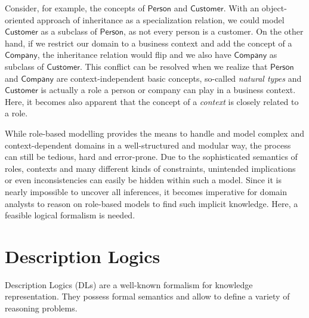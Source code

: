 Consider, for example, the concepts of $\mathsf{Person}$ and $\mathsf{Customer}$. With an
object-oriented approach of inheritance as a specialization relation, we could model
$\mathsf{Customer}$ as a subclass of $\mathsf{Person}$, as not every person is a customer.
On the other hand, if we restrict our domain to a business context and add the concept of a
$\mathsf{Company}$, the inheritance relation would flip and we also have $\mathsf{Company}$ as
subclass of $\mathsf{Customer}$.  This conflict can be resolved when we realize that
$\mathsf{Person}$ and $\mathsf{Company}$ are context-independent basic concepts, so-called
\emph{natural types} and $\mathsf{Customer}$ is actually a role a person or company can play in a
business context. Here, it becomes also apparent that the concept of a \emph{context} is closely
related to a role.

While role-based modelling provides the means to handle and model complex and context-dependent
domains in a well-structured and modular way, the process can still be tedious, hard and
error-prone. Due to the sophisticated semantics of roles, contexts and many different kinds of
constraints, unintended implications or even inconsistencies can easily be hidden within such a
model. Since it is nearly impossible to uncover all inferences, it becomes imperative for domain
analysts to reason on role-based models to find such implicit knowledge.  Here, a feasible logical
formalism is needed.

\section{Description Logics}
\label{sec:intro-description-logics}

Description Logics (DLs) \cite{DLhandbook-07} are a well-known formalism for knowledge
representation. They possess formal semantics and allow to define a variety of reasoning problems.

